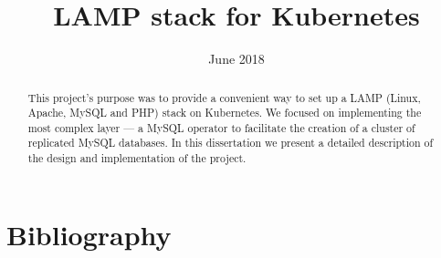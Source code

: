 \documentclass[licencjacka,en]{pracamgr}
\title{LAMP stack for Kubernetes}
\date{June 2018}
\begin{document}
  \maketitle

  \begin{abstract}
  This project’s purpose was to provide a convenient way to set up a LAMP (Linux, Apache, MySQL and PHP)
  stack on Kubernetes. We focused on implementing the most complex layer
  --- a MySQL operator to facilitate the creation of a cluster of replicated
  MySQL databases. In this dissertation we present a detailed description of
  the design and implementation of the project.
  \end{abstract}

  \tableofcontents

  
  
  
  
  
  
  
  

  \chapter*{Bibliography}
  \printbibliography[heading=none]
\end{document}
